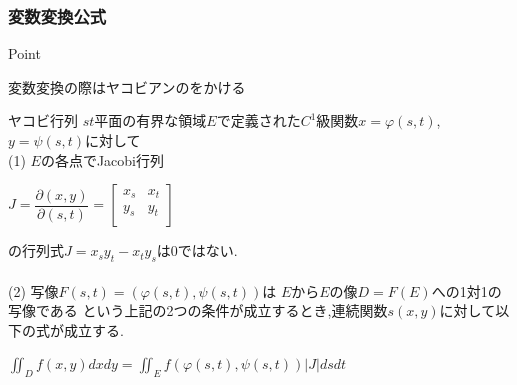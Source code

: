 \documentclass[a4paper]{jsarticle}
\begin{document}
\subsubsection{変数変換公式}
\begin{itembox}[l]{Point}
    \begin{center}
        変数変換の際はヤコビアンのをかける
    \end{center}
\end{itembox}
\begin{itembox}[l]{ヤコビ行列}
    $st$平面の有界な領域$E$で定義された$C^1$級関数$x=\varphi\left(s,t\right)$,$y=\psi\left(s,t\right)$に対して\\
    (1) $E$の各点でJacobi行列
    \begin{center}
        $J=\dfrac{\partial\left(x,y\right)}{\partial\left(s,t\right)}=
            \begin{bmatrix}
                x_s & x_t \\
                y_s & y_t \\
            \end{bmatrix}
        $
    \end{center}
    の行列式$J=x_sy_t-x_ty_s$は$0$ではない.\\\\
    (2) 写像$F\left(s,t\right)=\left(\varphi\left(s,t\right),\psi\left(s,t\right)\right)$は
    $E$から$E$の像$D=F\left(E\right)$への1対1の写像である
    という上記の2つの条件が成立するとき,連続関数$s\left(x,y\right)$に対して以下の式が成立する.\\
    \begin{center}
        $\displaystyle\iint_Df\left(x,y\right)dxdy=\iint_Ef\left(\varphi\left(s,t\right),\psi\left(s,t\right)\right)|J|dsdt$
    \end{center}
\end{itembox}
\end{document}
